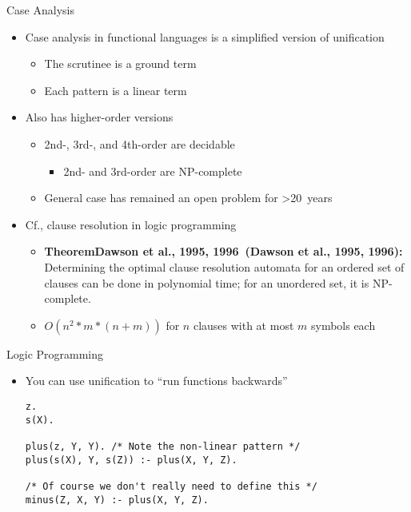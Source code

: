 \documentclass[pdf,fyma2]{prosper} %
\makeatletter
\newcommand{\thm}[1][]{%
    \def\thm@tmp{#1}%
    \textbf{Theorem\ifx\thm@tmp\@empty\relax\else\ (\thm@tmp)\fi:}\ }
\makeatother
\begin{document}
\begin{slide}{Case Analysis}
	\begin{itemize}
	\item Case analysis in functional languages is a simplified version of unification
        \begin{itemize}
        \item The scrutinee is a ground term
        \item Each pattern is a linear term
        \end{itemize}
    \item Also has higher-order versions
        \begin{itemize}
        \item 2nd-, 3rd-, and 4th-order are decidable
            \begin{itemize}
            \item 2nd- and 3rd-order are NP-complete
            \end{itemize}
        \item General case has remained an open problem for >20~years
        \end{itemize}
	\vspace{1em}
    \item Cf., clause resolution in logic programming
        \begin{itemize}
        \item \thm[Dawson et al., 1995, 1996] Determining the optimal clause resolution automata for an ordered set of clauses can be done in polynomial time; for an unordered set, it is NP-complete.
        \item $O(n^2*m*(n+m))$ for $n$ clauses with at most $m$ symbols each
        \end{itemize}
	\end{itemize}
\end{slide}

\begin{slide}{Logic Programming}
	\vspace{1em}
	\begin{itemize}
	\item You can use unification to ``run functions backwards''
\begin{lstlisting}
z.
s(X).

plus(z, Y, Y). /* Note the non-linear pattern */
plus(s(X), Y, s(Z)) :- plus(X, Y, Z).

/* Of course we don't really need to define this */
minus(Z, X, Y) :- plus(X, Y, Z).
\end{lstlisting}
	\end{itemize}
\end{slide}
\end{document}
